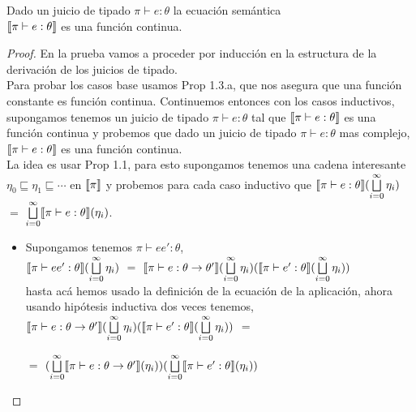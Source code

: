 \begin{proposition}

Dado un juicio de tipado $\pi \vdash e : \theta$ la ecuaci\'on sem\'antica
\\ 
$\llbracket \pi \vdash e : \theta \rrbracket$ es una funci\'on continua.

\end{proposition}

\begin{proof}

En la prueba vamos a proceder por inducci\'on en la estructura de la derivaci\'on 
de los juicios de tipado.\\

Para probar los casos base usamos Prop 1.3.a, que nos asegura que una funci\'on
constante es funci\'on continua. Continuemos entonces con los casos inductivos,
supongamos tenemos un juicio de tipado $\pi \vdash e : \theta$ tal que
$\llbracket \pi \vdash e : \theta \rrbracket$ es una funci\'on continua y probemos
que dado un juicio de tipado $\pi \vdash e : \theta$ mas complejo,
$\llbracket \pi \vdash e : \theta \rrbracket$ es una funci\'on continua.\\

La idea es usar Prop 1.1, para esto supongamos tenemos una cadena interesante
$\eta_0 \sqsubseteq \eta_1 \sqsubseteq \cdots$ en $\llbracket \pi \rrbracket$ y probemos
para cada caso inductivo que $\llbracket \pi \vdash e : \theta \rrbracket(\bigsqcup\limits^{\infty}_{i=0} \eta_i)$
$=$ $\bigsqcup\limits^{\infty}_{i=0} \llbracket \pi \vdash e : \theta \rrbracket (\eta_i)$.

\begin{itemize}

\item Supongamos tenemos $\pi \vdash ee' : \theta$,\\

$\llbracket \pi \vdash ee' : \theta \rrbracket(\bigsqcup\limits^{\infty}_{i=0} \eta_i)$ $=$
$\llbracket \pi \vdash e : \theta \rightarrow \theta' \rrbracket(\bigsqcup\limits^{\infty}_{i=0} \eta_i)
			(\llbracket \pi \vdash e' : \theta \rrbracket(\bigsqcup\limits^{\infty}_{i=0} \eta_i))$\\

hasta ac\'a hemos usado la definici\'on de la ecuaci\'on de la aplicaci\'on, ahora usando 
hip\'otesis inductiva dos veces tenemos,\\

$\llbracket \pi \vdash e : \theta \rightarrow \theta' \rrbracket(\bigsqcup\limits^{\infty}_{i=0} \eta_i)
			(\llbracket \pi \vdash e' : \theta \rrbracket(\bigsqcup\limits^{\infty}_{i=0} \eta_i))$ $=$
\begin{flushright}
$=$ $(\bigsqcup\limits^{\infty}_{i=0} \llbracket \pi \vdash e : \theta \rightarrow \theta' \rrbracket (\eta_i))
					(\bigsqcup\limits^{\infty}_{i=0} \llbracket \pi \vdash e' : \theta \rrbracket(\eta_i))$
\end{flushright}
					

\end{itemize}
\end{proof}
